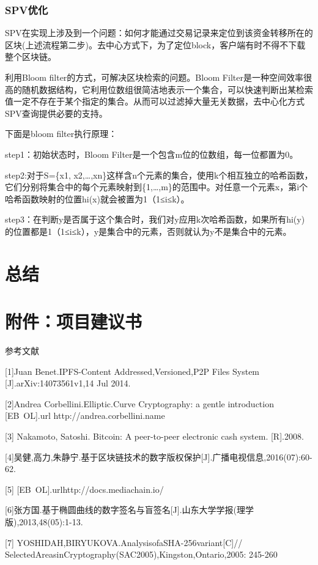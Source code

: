 \documentclass[withoutpreface,bwprint]{cumcmthesis} %
\begin{document}
\subsubsection{SPV优化}

SPV在实现上涉及到一个问题：如何才能通过交易记录来定位到该资金转移所在的区块(上述流程第二步)。去中心方式下，为了定位block，客户端有时不得不下载整个区块链。

利用Bloom filter的方式，可解决区块检索的问题。Bloom Filter是一种空间效率很高的随机数据结构，它利用位数组很简洁地表示一个集合，可以快速判断出某检索值一定不存在于某个指定的集合。从而可以过滤掉大量无关数据，去中心化方式SPV查询提供必要的支持。

下面是bloom filter执行原理：

step1：初始状态时，Bloom Filter是一个包含m位的位数组，每一位都置为0。

step2:对于S=\{x1, x2,…,xn\}这样含n个元素的集合，使用k个相互独立的哈希函数，它们分别将集合中的每个元素映射到\{1,…,m\}的范围中。对任意一个元素x，第i个哈希函数映射的位置hi(x)就会被置为1（1≤i≤k）。   

step3：在判断y是否属于这个集合时，我们对y应用k次哈希函数，如果所有hi(y)的位置都是1（1≤i≤k），y是集合中的元素，否则就认为y不是集合中的元素。

\section{总结}

\section{附件：项目建议书}

参考文献

[1]Juan Benet.IPFS-Content Addressed,Versioned,P2P Files System [J].arXiv:14073561v1,14 Jul 2014.

[2]Andrea Corbellini.Elliptic.Curve Cryptography: a gentle introduction [EB\ OL].url{ http://andrea.corbellini.name}

[3] Nakamoto, Satoshi. Bitcoin: A peer-to-peer electronic cash system. [R].2008.

[4]吴健,高力,朱静宁.基于区块链技术的数字版权保护[J].广播电视信息,2016(07):60-62.

[5] [EB\ OL].url{http://docs.mediachain.io/}

[6]张方国.基于椭圆曲线的数字签名与盲签名[J].山东大学学报(理学版),2013,48(05):1-13.

[7] YOSHIDAH,BIRYUKOVA.AnalysisofaSHA-256variant[C]//
SelectedAreasinCryptography(SAC2005),Kingston,Ontario,2005:
245-260
\end{document}
